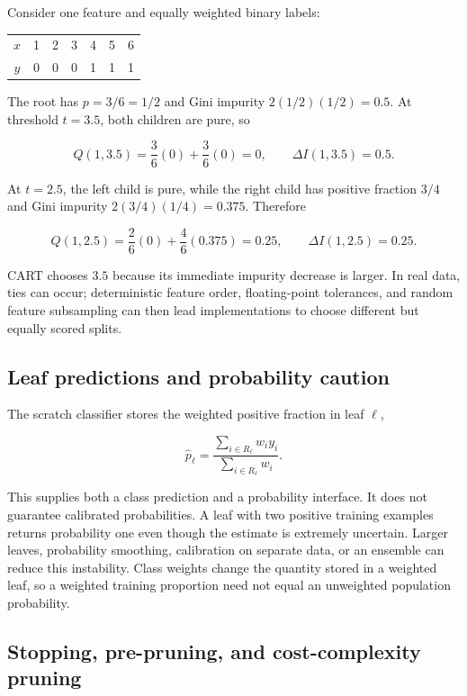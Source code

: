 \documentclass[11pt]{article}
\begin{document}
Consider one feature and equally weighted binary labels:

\begin{center}
\begin{tabular}{c@{\qquad}rrrrrr}
\toprule
$x$ & 1 & 2 & 3 & 4 & 5 & 6 \\
$y$ & 0 & 0 & 0 & 1 & 1 & 1 \\
\bottomrule
\end{tabular}
\end{center}

The root has $p=3/6=1/2$ and Gini impurity $2(1/2)(1/2)=0.5$. At threshold
$t=3.5$, both children are pure, so

\[
 Q(1,3.5)=\frac36(0)+\frac36(0)=0,
 \qquad
 \Delta I(1,3.5)=0.5.
\]

At $t=2.5$, the left child is pure, while the right child has positive fraction
$3/4$ and Gini impurity $2(3/4)(1/4)=0.375$. Therefore

\[
 Q(1,2.5)=\frac26(0)+\frac46(0.375)=0.25,
 \qquad
 \Delta I(1,2.5)=0.25.
\]

CART chooses $3.5$ because its immediate impurity decrease is larger. In real
data, ties can occur; deterministic feature order, floating-point tolerances,
and random feature subsampling can then lead implementations to choose different
but equally scored splits.

\subsection{Leaf predictions and probability caution}

The scratch classifier stores the weighted positive fraction in leaf $\ell$,

\[
 \hat p_{\ell}=\frac{\sum_{i\in R_{\ell}}w_i y_i}
 {\sum_{i\in R_{\ell}}w_i}.
\]

This supplies both a class prediction and a probability interface. It does not
guarantee calibrated probabilities. A leaf with two positive training examples
returns probability one even though the estimate is extremely uncertain.
Larger leaves, probability smoothing, calibration on separate data, or an
ensemble can reduce this instability. Class weights change the quantity stored
in a weighted leaf, so a weighted training proportion need not equal an
unweighted population probability.

\subsection{Stopping, pre-pruning, and cost-complexity pruning}
\end{document}
